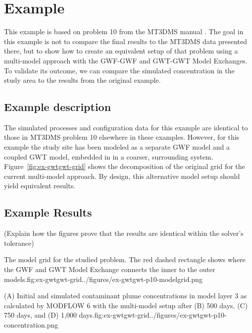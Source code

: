 \section{Example}

This example is based on problem 10 from the MT3DMS manual \citep{zheng1999mt3dms}. The goal in this example is not to compare the final results to the MT3DMS data presented there, but to show how to create an equivalent setup of that problem using a multi-model approach with the GWF-GWF and GWT-GWT Model Exchanges. To validate its outcome, we can compare the simulated concentration in the study area to the \mf results from the original example.

\subsection{Example description}

The simulated processes and configuration data for this example are identical to those in \mf  MT3DMS problem 10 elsewhere in these examples. However, for this example the study site has been modeled as a separate GWF model and a coupled GWT model, embedded in in a coarser, surrounding system. Figure~\ref{fig:ex-gwtgwt-grid} shows the decomposition of the original grid for the current multi-model approach. By design, this alternative model setup should yield equivalent results.

\subsection{Example Results}

(Explain how the figures prove that the results are identical within the solver’s tolerance)

\begin{StandardFigure}{The model grid for the studied problem. The red dashed rectangle shows where the GWF and GWT Model Exchange connects the inner to the outer models.}{fig:ex-gwtgwt-grid}{../figures/ex-gwtgwt-p10-modelgrid.png}
\end{StandardFigure}

\begin{StandardFigure}{(A) Initial and simulated contaminant plume concentrations in model layer 3 as calculated by MODFLOW 6 with the multi-model setup after (B) 500 days, (C) 750 days, and (D) 1,000 days.}{fig:ex-gwtgwt-grid}{../figures/ex-gwtgwt-p10-concentration.png}
\end{StandardFigure}

